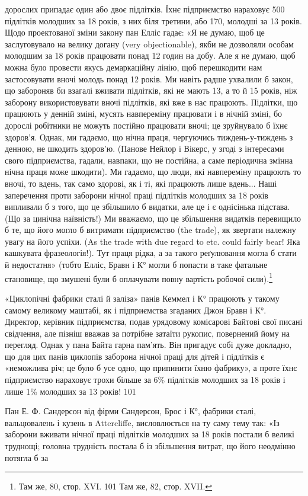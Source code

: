 \parcont{}  %
дорослих припадає один або двоє підлітків. Їхнє підприємство нараховує
500 підлітків молодших за 18 років, з них біля третини,
або 170, молодші за 13 років. Щодо проектованої зміни закону
пан Елліс гадає: «Я не думаю, щоб це заслуговувало на велику
догану (very objectionable), якби не дозволяли особам молодшим
за 18 років працювати понад 12 годин на добу. Але я не думаю,
щоб можна було провести якусь демаркаційну лінію, щоб перешкодити
нам застосовувати вночі молодь понад 12 років. Ми навіть
радше ухвалили б закон, що забороняв би взагалі вживати
підлітків, які не мають 13, а то й 15 років, ніж заборону використовувати
вночі підлітків, які вже в нас працюють. Підлітки,
що працюють у денній зміні, мусять навпереміну працювати і
в нічній зміні, бо дорослі робітники не можуть постійно працювати
вночі; це зруйнувало б їхнє здоров’я. Однак, ми гадаємо,
що нічна праця, чергуючись тиждень-у-тиждень з денною,
не шкодить здоров’ю. (Панове Нейлор і Вікерс, у згоді з інтересами
свого підприємства, гадали, навпаки, що не постійна, а
саме періодична змінна нічна праця може шкодити). Ми гадаємо,
що люди, які навпереміну працюють то вночі, то вдень, так само
здорові, як і ті, які працюють лише вдень... Наші заперечення
проти заборони нічної праці підлітків молодших за 18 років
випливали б з того, що це збільшило б видатки, але це і є однісінька
підстава. (Що за цинічна наївність!) Ми вважаємо, що це
збільшення видатків перевищило б те, що його могло б витримати
підприємство (the trade), як звертати належну увагу на його
успіхи. (As the trade with due regard to etc. could fairly bear!
Яка кашкувата фразеологія!). Тут праця рідка, а за такого реґулювання
могла б стати й недостатня» (тобто Елліс, Бравн і К°
могли б попасти в таке фатальне становище, що змушені були б
оплачувати повну вартість робочої сили).\footnote{
Там же, 80, стор. XVI.
101 Там же, 82, стор. XVII.
}

«Циклопічні фабрики сталі й заліза» панів Кеммел і К°
працюють у такому самому великому маштабі, як і підприємства
згаданих Джон Бравн і К°. Директор, керівник підприємства,
подав урядовому комісарові Байтові свої писані свідчення, але
пізніш вважав за потрібне затаїти рукопис, повернений йому на
перегляд. Однак у пана Байта гарна пам’ять. Він пригадує собі
дуже докладно, що для цих панів циклопів заборона нічної
праці для дітей і підлітків є «неможлива річ; це було б усе одно,
що припинити їхню фабрику», а проте їхнє підприємство нараховує
трохи більше за 6\% підлітків молодших за 18 років і лише
1\% молодших за 13 років! 101

Пан Е. Ф. Сандерсон від фірми Сандерсон, Брос і К°, фабрики
сталі, вальцювалень і кузень в Attercliffe, висловлюється на ту
саму тему так: «Із заборони вживати нічної праці підлітків молодших
за 18 років постали б великі труднощі; головна трудність
постала б із збільшення витрат, що його неодмінно потягла б за
\parbreak{}  %
